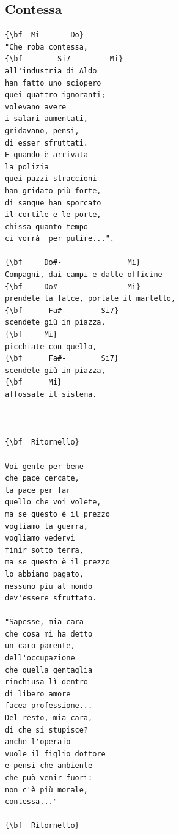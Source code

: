\documentclass[a4paper]{article}
\begin{document}
\subsection{Contessa}
\begin{multicols}{2}\begin{Verbatim}[commandchars=\\\{\}]
{\bf  Mi       Do}
"Che roba contessa,
{\bf        Si7         Mi}
all'industria di Aldo
han fatto uno sciopero
quei quattro ignoranti;
volevano avere
i salari aumentati,
gridavano, pensi,
di esser sfruttati.
E quando è arrivata
la polizia
quei pazzi straccioni
han gridato più forte,
di sangue han sporcato
il cortile e le porte,
chissa quanto tempo
ci vorrà  per pulire...".

{\bf     Do#-               Mi}
Compagni, dai campi e dalle officine
{\bf     Do#-               Mi}
prendete la falce, portate il martello,
{\bf      Fa#-        Si7}
scendete giù in piazza,
{\bf     Mi}
picchiate con quello,
{\bf      Fa#-        Si7}
scendete giù in piazza,
{\bf      Mi}
affossate il sistema.



{\bf  Ritornello}

Voi gente per bene
che pace cercate,
la pace per far
quello che voi volete,
ma se questo è il prezzo
vogliamo la guerra,
vogliamo vedervi
finir sotto terra,
ma se questo è il prezzo
lo abbiamo pagato,
nessuno piu al mondo
dev'essere sfruttato.

"Sapesse, mia cara
che cosa mi ha detto
un caro parente,
dell'occupazione
che quella gentaglia
rinchiusa lì dentro
di libero amore
facea professione...
Del resto, mia cara,
di che si stupisce?
anche l'operaio
vuole il figlio dottore
e pensi che ambiente
che può venir fuori:
non c'è più morale,
contessa..."

{\bf  Ritornello}

\end{Verbatim}
\end{multicols}\newpage
\end{document}

